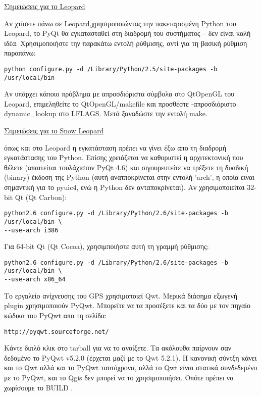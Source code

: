 \underline{Σημειώσεις για το Leopard}

Αν χτίσετε πάνω σε Leopard,χρησιμοποιώντας την πακεταρισμένη Python του Leopard, το PyQt θα εγκατασταθεί στη διαδρομή του συστήματος – δεν είναι καλή ιδέα. Χρησιμοποιήστε την παρακάτω εντολή ρύθμισης, αντί για τη βασική ρύθμιση παραπάνω:

\begin{verbatim}
python configure.py -d /Library/Python/2.5/site-packages -b /usr/local/bin
\end{verbatim}

Αν υπάρχει κάποιο πρόβλημα με απροσδιόριστα σύμβολα στο QtOpenGL του Leopard, επιμεληθείτε το QtOpenGL/makefile και προσθέστε -απροσδιόριστο dynamic\_lookup στο LFLAGS.
Μετά ξαναδώστε την εντολή make.

\underline{Σημειώσεις για το Snow Leopard}

όπως και στο Leopard η εγκατάσταση πρέπει να γίνει έξω απο τη διαδρομή εγκατάστασης του Python. Επίσης χρειάζεται να καθοριστεί η αρχιτεκτονική που θέλετε (απαιτείται τουλάχιστον PyQt 4.6) και σιγουρευτείτε να τρέξετε τη δυαδική (binary) έκδοση της Python (αυτή ανατποκρίνεται στην εντολή 'arch', η οποία ειναι σημαντική για το pyuic4, ενώ η Python δεν ανταποκρίνεται). Αν χρησιμοποιείται 32-bit Qt (Qt Carbon):

\begin{verbatim}
python2.6 configure.py -d /Library/Python/2.6/site-packages -b /usr/local/bin \
--use-arch i386
\end{verbatim}

Για 64-bit Qt (Qt Cocoa), χρησιμποιήστε αυτή τη γραμμή ρύθμισης:

\begin{verbatim}
python2.6 configure.py -d /Library/Python/2.6/site-packages -b /usr/local/bin \
--use-arch x86_64
\end{verbatim}

Το εργαλείο ανίχνευσης του GPS χρησιμοποιεί Qwt. Μερικά διάσημα εξωγενή plugin χρησιμοποιούν PyQwt. Μπορείτε να τα προσέξετε και τα δύο με τον πηγαίο κώδικα του PyQwt απο τη σελίδα:

\begin{verbatim}
http://pyqwt.sourceforge.net/
\end{verbatim}

Κάντε διπλό κλικ στο tarball για να το ανοίξετε. Τα ακόλουθα παίρνουν σαν δεδομένο το PyQwt v5.2.0 (έρχεται μαζί με το Qwt 5.2.1). Η κανονική σύντξη κάνει και το Qwt αλλά και το PyQwt ταυτόχρονα, αλλά το Qwt είναι στατικά συνδεδεμένο με το PyQwt, και το Qgis δεν μπορεί να το χρησιμοποιήσει. Οπότε πρέπει να χωρίσουμε το BUILD .

